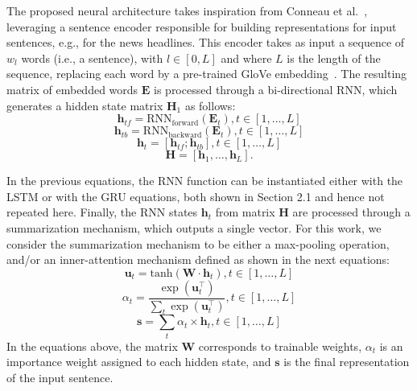 The proposed neural architecture takes inspiration from Conneau et al.~\cite{supervised}, leveraging a sentence encoder responsible for building representations for input sentences, e.g., for the news headlines. This encoder takes as input a sequence of $w_l$ words (i.e., a sentence), with $l \in [0, L]$ and where $L$ is the length of the sequence, replacing each word by a pre-trained GloVe embedding~\cite{glove}. The resulting matrix of embedded words $\boldsymbol{E}$ is processed through a bi-directional RNN, which  generates a hidden state matrix $\boldsymbol{H}_1$ as follows:
\begin{equation}
\boldsymbol{h}_{tf} = \mathrm{RNN_{forward}}(\boldsymbol{E}_t), t \in [1, \ldots, L] 
\end{equation}
\begin{equation}
\boldsymbol{h}_{tb} = \mathrm{RNN_{backward}}(\boldsymbol{E}_t), t \in [1, \ldots, L]
\end{equation}
\begin{equation}
\boldsymbol{h}_t = [\boldsymbol{h}_{tf}; \boldsymbol{h}_{tb}], t \in [1, \ldots, L]
\end{equation}
\begin{equation}
\boldsymbol{H} = [\boldsymbol{h}_1, \ldots, \boldsymbol{h}_L].
\label{eq:bigru1}
\end{equation}

In the previous equations, the RNN function can be instantiated either with the LSTM or with the GRU equations, both shown in Section 2.1 and hence not repeated here. Finally, the RNN states $\boldsymbol{h}_{t}$ from matrix $\boldsymbol{H}$ are processed through a summarization mechanism, which outputs a single vector. For this work, we consider the summarization mechanism to be either a max-pooling operation, and/or an inner-attention mechanism defined as shown in the next equations:
\begin{equation}
\boldsymbol{u}_{t} = \mathrm{tanh}(\boldsymbol{W} \cdot \boldsymbol{h}_{t}),           t \in [1, \ldots, L]
\end{equation}
\begin{equation}
\alpha_{t} = \frac{\exp(\boldsymbol{u}_{t}^\top)}{\sum\nolimits_t\exp(\boldsymbol{u}_{t}^\top)}, t \in [1, \ldots, L]
\end{equation}
\begin{equation}
\boldsymbol{s} = \sum_t \alpha_{t} \times \boldsymbol{h}_{t},  t \in [1, \ldots, L]
\label{eq:attention}
\end{equation}
In the equations above, the matrix $\boldsymbol{W}$ corresponds to trainable weights, $\alpha_t$ is an importance weight assigned to each hidden state, and $\boldsymbol{s}$ is the final representation of the input sentence.

